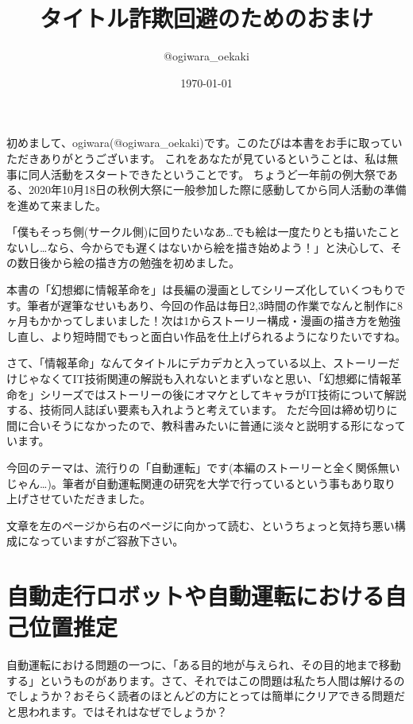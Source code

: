 \documentclass[12pt]{article}
\title{タイトル詐欺回避のためのおまけ}
\author{@ogiwara\_oekaki}
\date{\today}
\begin{document}
\maketitle

初めまして、ogiwara(@ogiwara\_oekaki)です。このたびは本書をお手に取っていただきありがとうございます。
これをあなたが見ているということは、私は無事に同人活動をスタートできたということです。
ちょうど一年前の例大祭である、2020年10月18日の秋例大祭に一般参加した際に感動してから同人活動の準備を進めて来ました。

「僕もそっち側(サークル側)に回りたいなあ…でも絵は一度たりとも描いたことないし…なら、今からでも遅くはないから絵を描き始めよう！」と決心して、その数日後から絵の描き方の勉強を初めました。

本書の「幻想郷に情報革命を」は長編の漫画としてシリーズ化していくつもりです。筆者が遅筆なせいもあり、今回の作品は毎日2,3時間の作業でなんと制作に8ヶ月もかかってしまいました！次は1からストーリー構成・漫画の描き方を勉強し直し、より短時間でもっと面白い作品を仕上げられるようになりたいですね。

さて、「情報革命」なんてタイトルにデカデカと入っている以上、ストーリーだけじゃなくてIT技術関連の解説も入れないとまずいなと思い、「幻想郷に情報革命を」シリーズではストーリーの後にオマケとしてキャラがIT技術について解説する、技術同人誌ぽい要素も入れようと考えています。
ただ今回は締め切りに間に合いそうになかったので、教科書みたいに普通に淡々と説明する形になっています。


今回のテーマは、流行りの「自動運転」です(本編のストーリーと全く関係無いじゃん…)。筆者が自動運転関連の研究を大学で行っているという事もあり取り上げさせていただきました。


文章を左のページから右のページに向かって読む、というちょっと気持ち悪い構成になっていますがご容赦下さい。

\newpage

\section{自動走行ロボットや自動運転における自己位置推定}

自動運転における問題の一つに、「ある目的地が与えられ、その目的地まで移動する」というものがあります。さて、それではこの問題は私たち人間は解けるのでしょうか？おそらく読者のほとんどの方にとっては簡単にクリアできる問題だと思われます。ではそれはなぜでしょうか？
\end{document}
